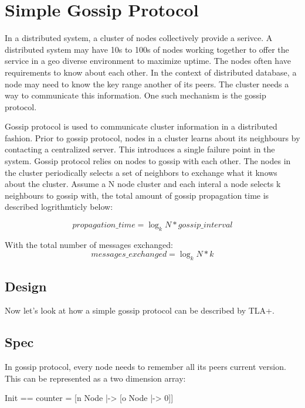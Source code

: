 \chapter{Simple Gossip Protocol}

In a distributed system, a cluster of nodes collectively provide a serivce. A
distributed system may have 10s to 100s of nodes working together to offer the
service in a geo diverse environment to maximize uptime. The nodes often
have requirements to know about each other. In the context of distributed
database, a node may need to know the key range another of its peers. The
cluster needs a way to communicate this information. One such mechanism is the
gossip protocol.\newline

Gossip protocol is used to communicate cluster information in a distributed
fashion. Prior to gossip protocol, nodes in a cluster learns about its
neighbours by contacting a centralized server. This introduces a single failure
point in the system. Gossip protocol relies on nodes to gossip with each other.
The nodes in the cluster periodically selects a set of neighbors to exchange
what it knows about the cluster. Assume a N node cluster and each interal a node
selects k neighbours to gossip with, the total amount of gossip propagation time
is described logrithmticly below:

\begin{equation} 
    propagation\_time = \log_k N * gossip\_interval
\end{equation}

With the total number of messages exchanged: 
\begin{equation} 
    messages\_exchanged = \log_k N * k
\end{equation}

\section{Design}

Now let's look at how a simple gossip protocol can be described by TLA+.

\section{Spec}

In gossip protocol, every node needs to remember all its peers current
version. This can be represented as a two dimension array:\newline
\begin{tla}
    Init == counter = [n \in Node |-> [o \in Node |-> 0]] 
\end{tla}
\begin{tlatex}
\end{tlatex}
\newline

